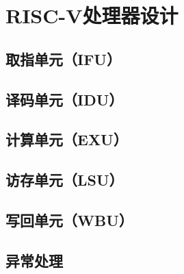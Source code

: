

\chapter{RISC-V处理器设计}

\section{取指单元（IFU）}

\section{译码单元（IDU）}

\section{计算单元（EXU）}

\section{访存单元（LSU）}

\section{写回单元（WBU）}

\section{异常处理}




